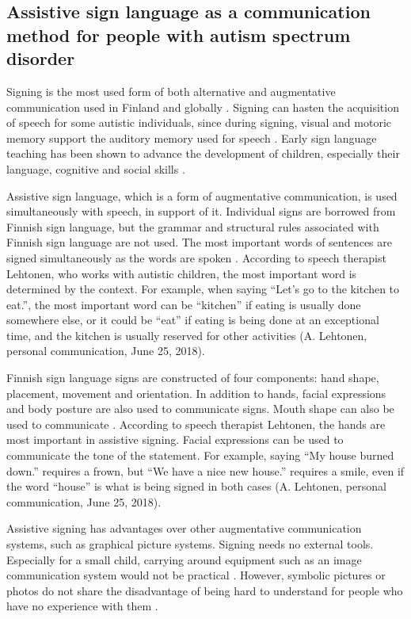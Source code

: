 
\subsection{Assistive sign language as a communication method for people with autism spectrum disorder}

Signing is the most used form of both alternative and augmentative communication used in Finland \cite{puheSuomi} and globally \cite{tetzchner}. Signing can hasten the acquisition of speech for some autistic individuals, since during signing, visual and motoric memory support the auditory memory used for speech \cite{bonvillian1981sign, autismi}. Early sign language teaching has been shown to advance the development of children, especially their language, cognitive and social skills \cite{puheSuomi}. 

Assistive sign language, which is a form of augmentative communication, is used simultaneously with speech, in support of it. Individual signs are borrowed from Finnish sign language, but the grammar and structural rules associated with Finnish sign language are not used. The most important words of sentences are signed simultaneously as the words are spoken \cite{puheSuomi}. According to speech therapist Lehtonen, who works with autistic children, the most important word is determined by the context. For example, when saying ``Let's go to the kitchen to eat.'', the most important word can be ``kitchen'' if eating is usually done somewhere else, or it could be ``eat'' if eating is being done at an exceptional time, and the kitchen is usually reserved for other activities  (A. Lehtonen, personal communication, June 25, 2018).

Finnish sign language signs are constructed of four components: hand shape, placement, movement and orientation. In addition to hands, facial expressions and body posture are also used to communicate signs. Mouth shape can also be used to communicate \cite{puheSuomi}. According to speech therapist Lehtonen, the hands are most important in assistive signing. Facial expressions can be used to communicate the tone of the statement. For example, saying ``My house burned down.'' requires a frown, but ``We have a nice new house.'' requires a smile, even if the word ``house'' is what is being signed in both cases (A. Lehtonen, personal communication, June 25, 2018).  

Assistive signing has advantages over other augmentative communication systems, such as graphical picture systems. Signing needs no external tools. Especially for a small child, carrying around equipment such as an image communication system would not be practical \cite{puheSuomi}. However, symbolic pictures or photos do not share the disadvantage of being hard to understand for people who have no experience with them \cite{tetzchner}.

